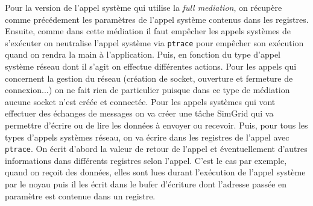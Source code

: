 Pour la version de l'appel système qui utilise la \textit{full mediation}, on récupère comme précédement les paramètres de l'appel système contenus dans les registres. Ensuite, comme dans cette médiation il faut empêcher les appels systèmes de s'exécuter on neutralise l'appel système via \texttt{ptrace} pour empêcher son exécution quand on rendra la main à l'application. Puis, en fonction du type d'appel système réseau dont il s'agit on effectue différentes actions. Pour les appels qui concernent la gestion du réseau (création de socket, ouverture et fermeture de connexion...) on ne fait rien de particulier puisque dans ce type de médiation aucune socket n'est créée et connectée. Pour les appels systèmes qui vont effectuer des échanges de messages on va créer une tâche SimGrid qui va permettre d'écrire ou de lire les données à envoyer ou recevoir. Puis, pour tous les types d'appels systèmes réseau, on va écrire dans les registres de l'appel avec \texttt{ptrace}. On écrit d'abord la valeur de retour de l'appel et éventuellement d'autres informations dans différents registres selon l'appel. C'est le cas par exemple, quand on reçoit des données, elles sont lues durant l'exécution de l'appel système par le noyau puis il les écrit dans le bufer d'écriture dont l'adresse passée en paramètre est contenue dans un registre.
